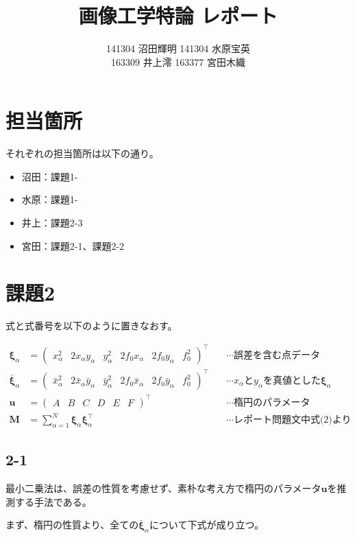\documentclass[12pt,a4j]{jsarticle}
\title{画像工学特論 レポート}
\author{141304 沼田輝明  141304 水原宝英 \\ 163309 井上澪  163377 宮田木織}
\newcommand{\xa}{x_\alpha}
\newcommand{\bxa}{\bar{x}_\alpha}
\newcommand{\ya}{y_\alpha}
\newcommand{\bya}{\bar{y}_\alpha}
\newcommand{\xia}{\bm{\xi}_\alpha}
\newcommand{\bxia}{\bar{\bm{\xi}}_\alpha}
\begin{document}
  \maketitle %
  \newpage

\section*{担当箇所}
  それぞれの担当箇所は以下の通り。
  \begin{itemize}
    \item 沼田：課題1-
    \item 水原：課題1-
    \item 井上：課題2-3
    \item 宮田：課題2-1、課題2-2
  \end{itemize}
  \newpage

\section*{課題2}
  式と式番号を以下のように置きなおす。

  \begin{align}
    \xia &= \begin{pmatrix}\xa^2 & 2\xa\ya & \ya^2 & 2f_0\xa & 2f_0\ya & f_0^2\end{pmatrix}^\top
     & \quad\cdots\text{誤差を含む点データ} \\
    \bxia &= \begin{pmatrix}\bxa^2 & 2\bxa\bya & \bya^2 & 2f_0\bxa & 2f_0\bya & f_0^2\end{pmatrix}^\top
     & \quad\cdots\text{$\xa$と$\ya$を真値とした$\xia$} \\
    \bm{u} &= \begin{pmatrix}A & B & C & D & E & F\end{pmatrix}^\top
     & \quad\cdots\text{楕円のパラメータ} \\
    \bm{M} &= \sum_{\alpha = 1}^N \xia \xia^\top
     & \quad\cdots\text{レポート問題文中式(2)より} \label{eq:M}
  \end{align}

  \subsection*{2-1}
  最小二乗法は、誤差の性質を考慮せず、素朴な考え方で楕円のパラメータ$\bm{u}$を推測する手法である。\par
  まず、楕円の性質より、全ての$\bxia$について下式が成り立つ。
\end{document}
